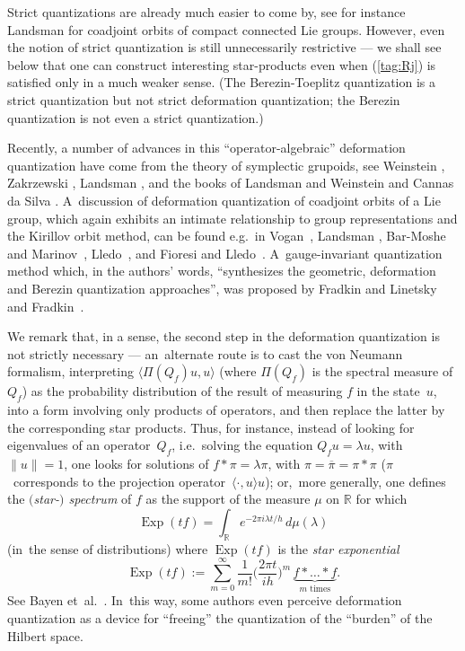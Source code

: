 \documentclass[12pt]{amsart}
\numberwithin{equation}{section}
\theoremstyle{remark}
\newcommand\spr[2]{\langle #1,#2\rangle}
\newcommand\RR{\mathbb R}
\begin{document}
Strict quantizations are already much easier to come by, see for instance
Landsman \cite{bib:LandsA} for coadjoint orbits of compact connected Lie
groups. However, even the notion of strict quantization is still unnecessarily
restrictive --- we shall see below that one can construct interesting
star-products even when (\ref{tag:Rj}) is satisfied only in a much weaker
sense. (The Berezin-Toeplitz quantization is a strict quantization but not
strict deformation quantization; the Berezin quantization is not even a strict
quantization.)

Recently, a number of advances in this ``operator-algebraic'' deformation
quantization %
have come from the theory of symplectic grupoids, see
Weinstein \cite{bib:WeinGrpd}, Zakrzewski \cite{bib:Zakr}, Landsman
\cite{bib:LandsO} \cite{bib:LandsJ}, and the books of Landsman
\cite{bib:LandsBk} and Weinstein and Cannas da Silva \cite{bib:CdSWei}.
A~discussion of deformation quantization of coadjoint orbits of a Lie group,
which again exhibits an intimate relationship to group representations and the
Kirillov orbit method, can be found e.g.~in Vogan~\cite{bib:Vogan}, Landsman
\cite{bib:LandsA}, Bar-Moshe and Marinov~\cite{bib:MarinA},
Lledo~\cite{bib:Lledo}, and Fioresi and Lledo~\cite{bib:FioL}.
A~gauge-invariant quantization method which, in the authors' words,
``synthesizes the geometric, deformation and Berezin quantization approaches'',
was proposed by Fradkin and Linetsky \cite{bib:FradLin} and
Fradkin~\cite{bib:Fradk}.

We remark that, in a sense, the second step in the deformation quantization is
not strictly necessary --- an~alternate route is to cast the von Neumann
formalism, interpreting $\spr{\Pi(Q_f)u}u$ (where $\Pi(Q_f)$ is the spectral
measure of~$Q_f$) as the probability distribution of the result of measuring
$f$ in the state~$u$, into a form involving only products of operators, and
then replace the latter by the corresponding star products. Thus, for instance,
instead of looking for eigenvalues of an operator~$Q_f$, i.e.~solving the
equation $Q_f u=\lambda u$, with $\|u\|=1$, one looks for solutions of $f*\pi=
\lambda\pi$, with $\pi=\overline\pi=\pi*\pi$ ($\pi$~corresponds to the
projection operator~$\spr\cdot u u$); or,~more generally, one defines the
{\it $($star-$)$ spectrum\/} of $f$ as the support of the measure $\mu$ on
$\RR$ for which
$$ \operatorname{Exp}(tf) = \int_\RR e^{-2\pi i\lambda t/h} \,d\mu(\lambda)  $$
(in~the sense of distributions) where $\operatorname{Exp}(tf)$ is the {\it star
exponential\/}
$$ \operatorname{Exp}(tf) := \sum_{m=0}^\infty \frac1{m!} \Big(\frac{2\pi
t}{ih}\Big)^m \,\underbrace{f*\dots*f}_{m\text{ times}} .  $$
See Bayen et~al.~\cite{bib:BFFLS}. In~this way, some authors even perceive
deformation quantization as a device for ``freeing'' the quantization of the
``burden'' of the Hilbert space.
\end{document}
